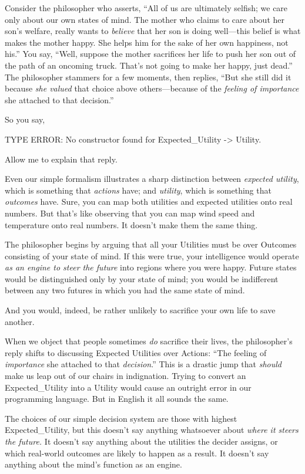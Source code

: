 {
 Consider the philosopher who asserts, ``All of us
are ultimately selfish; we care only about our own states of mind. The
mother who claims to care about her son's welfare,
really wants to \textit{believe} that her son is doing well---this
belief is what makes the mother happy. She helps him for the sake of
her own happiness, not his.'' You say,
``Well, suppose the mother sacrifices her life to push
her son out of the path of an oncoming truck. That's
not going to make her happy, just dead.'' The
philosopher stammers for a few moments, then replies,
``But she still did it because \textit{she valued}
that choice above others---because of the \textit{feeling of
importance} she attached to that decision.''}

{
 So you say,}

{
 TYPE ERROR: No constructor found for Expected\_Utility
-{\textgreater} Utility.}

{
 Allow me to explain that reply.}

{
 Even our simple formalism illustrates a sharp distinction between
\textit{expected utility}, which is something that \textit{actions}
have; and \textit{utility}, which is something that \textit{outcomes}
have. Sure, you can map both utilities and expected utilities onto real
numbers. But that's like observing that you can map
wind speed and temperature onto real numbers. It
doesn't make them the same thing.}

{
 The philosopher begins by arguing that all your Utilities must be
over Outcomes consisting of your state of mind. If this were true, your
intelligence would operate \textit{as an engine to steer the future}
into regions where you were happy. Future states would be distinguished
only by your state of mind; you would be indifferent between any two
futures in which you had the same state of mind.}

{
 And you would, indeed, be rather unlikely to sacrifice your own
life to save another.}

{
 When we object that people sometimes \textit{do} sacrifice their
lives, the philosopher's reply shifts to discussing
Expected Utilities over Actions: ``The feeling of
\textit{importance} she attached to that
\textit{decision}.'' This is a drastic jump that
\textit{should} make us leap out of our chairs in indignation. Trying
to convert an Expected\_Utility into a Utility would cause an outright
error in our programming language. But in English it all sounds the
same.}

{
 The choices of our simple decision system are those with highest
Expected\_Utility, but this doesn't say anything
whatsoever about \textit{where it steers the future.} It
doesn't say anything about the utilities the decider
assigns, or which real-world outcomes are likely to happen as a result.
It doesn't say anything about the
mind's function as an engine.}

